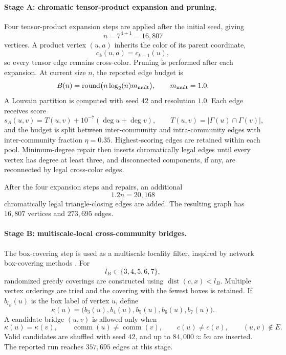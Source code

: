 \documentclass[12pt]{article}
\begin{document}
\paragraph{Stage A: chromatic tensor-product expansion and pruning.}
Four tensor-product expansion steps are applied after the initial seed, giving
\[
n=7^{4+1}=16{,}807
\]
vertices.  A product vertex \((u,a)\) inherits the color of its parent
coordinate,
\[
c_k(u,a)=c_{k-1}(u),
\]
so every tensor edge remains cross-color.  Pruning is performed after each
expansion.  At current size \(n\), the reported edge budget is
\[
B(n)=\operatorname{round}\!\big(n\log_2(n)m_{\rm mult}\big),
\qquad m_{\rm mult}=1.0.
\]
A Louvain partition is computed with seed \(42\) and resolution \(1.0\).
Each edge receives score
\[
s_A(u,v)=T(u,v)+10^{-7}(\deg u+\deg v),
\qquad
T(u,v)=|\Gamma(u)\cap\Gamma(v)|,
\]
and the budget is split between inter-community and intra-community edges
with inter-community fraction \(\eta=0.35\).  Highest-scoring edges are
retained within each pool.  Minimum-degree repair then inserts chromatically
legal edges until every vertex has degree at least three, and disconnected
components, if any, are reconnected by legal cross-color edges.

After the four expansion steps and repairs, an additional
\[
1.2n=20{,}168
\]
chromatically legal triangle-closing edges are added.  The resulting graph has
\(16{,}807\) vertices and \(273{,}695\) edges.

\paragraph{Stage B: multiscale-local cross-community bridges.}
The box-covering step is used as a multiscale locality filter, inspired by
network box-covering methods \cite{Song2005,Song2007memb}.  For
\[
l_B\in\{3,4,5,6,7\},
\]
randomized greedy coverings are constructed using
\(\operatorname{dist}(c,x)<l_B\).  Multiple vertex orderings are tried and
the covering with the fewest boxes is retained.  If \(b_{l_B}(u)\) is the
box label of vertex \(u\), define
\[
\kappa(u)=\big(b_3(u),b_4(u),b_5(u),b_6(u),b_7(u)\big).
\]
A candidate bridge \((u,v)\) is allowed only when
\[
\kappa(u)=\kappa(v),\qquad
\operatorname{comm}(u)\neq\operatorname{comm}(v),\qquad
c(u)\neq c(v),\qquad
(u,v)\notin E.
\]
Valid candidates are shuffled with seed \(42\), and up to
\(84{,}000\approx5n\) are inserted.  The reported run reaches
\(357{,}695\) edges at this stage.
\end{document}
